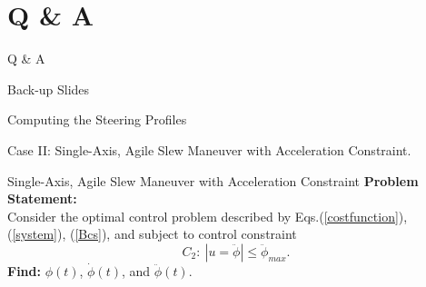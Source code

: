 \documentclass{beamer}
\begin{document}
\section{Q \& A }
\begin{frame}
\begin{block}{}
\begin{center}
\Huge{Q \& A}
\end{center}
\end{block}
\end{frame}
%
\begin{frame}
\begin{block}{}
\begin{center}
\Huge{Back-up Slides}
\end{center}
\end{block}
\end{frame}
\begin{frame}
\begin{block}{}
\begin{center}
{\LARGE{Computing the Steering Profiles}}
\begin{center}
Case II: Single-Axis, Agile Slew Maneuver with Acceleration Constraint.
\end{center}
\end{center}
\end{block}
\end{frame}
\begin{frame}
\begin{block}{ Single-Axis, Agile Slew Maneuver with Acceleration Constraint}
 {\bf Problem Statement:} \\ Consider the optimal control problem described by Eqs.(\ref{costfunction}), (\ref{system}), (\ref{Bcs}), and subject to control constraint
\begin{equation}
C_2: \ |u=\ddot{\phi}|\leq \ddot{\phi}_{max}.
\end{equation}
 {\bf Find:} $\phi(t)$, $\dot{\phi}(t)$, and $\ddot{\phi}(t)$.
 \end{block}
 \end{frame}
\end{document}
